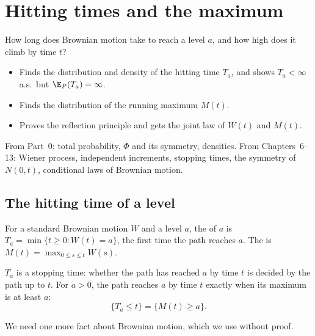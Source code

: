 \chapter{Hitting times and the maximum}
\label{ch:hitting}

\begin{question}
How long does Brownian motion take to reach a level $a$, and how high does it climb by time $t$?
\end{question}

\begin{whatfor}
\begin{itemize}
  \item Finds the distribution and density of the hitting time $T_a$, and shows $T_a<\infty$ a.s.\ but $\E_P(T_a)=\infty$.
  \item Finds the distribution of the running maximum $M(t)$.
  \item Proves the reflection principle and gets the joint law of $W(t)$ and $M(t)$.
\end{itemize}
\end{whatfor}

\begin{prereq}
From Part~0: total probability, $\Phi$ and its symmetry, densities. From Chapters~6--13: Wiener process, independent increments, stopping times, the symmetry of $N(0,t)$, conditional laws of Brownian motion.
\end{prereq}

\section{The hitting time of a level}

\begin{definition}
For a standard Brownian motion $W$ and a level $a$, the  of $a$ is $T_a=\min\{t\ge0:W(t)=a\}$, the first time the path reaches $a$. The  is $M(t)=\max_{0\le s\le t}W(s)$.
\end{definition}

$T_a$ is a stopping time: whether the path has reached $a$ by time $t$ is decided by the path up to $t$. For $a>0$, the path reaches $a$ by time $t$ exactly when its maximum is at least $a$:
\[
  \{T_a\le t\}=\{M(t)\ge a\}.
\]

We need one more fact about Brownian motion, which we use without proof.


